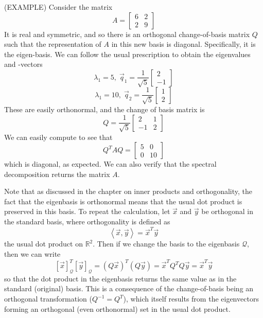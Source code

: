 (EXAMPLE) Consider the matrix \[ A= \left[ \begin{array}{cc} 6 & 2 \\ 2 & 9 \end{array} \right] \] It is real and symmetric, and so there is an orthogonal change-of-basis matrix $Q$ such that the representation of $A$ in this new basis is diagonal. Specifically, it is the eigen-basis. We can follow the usual prescription to obtain the eigenvalues and -vectors \[ \lambda_1 = 5, \; \vec{q}_1 =\frac{1}{\sqrt{5}} \left[ \begin{array}{c} 2 \\ -1 \end{array}\right] \] \[ \lambda_1 = 10, \; \vec{q}_2 =\frac{1}{\sqrt{5}} \left[ \begin{array}{c} 1 \\ 2 \end{array}\right] \] These are easily orthonormal, and the change of basis matrix is \[ Q = \frac{1}{\sqrt{5}} \left[ \begin{array}{cc} 2 & 1 \\ -1 & 2 \end{array}\right] \] We can easily compute to see that \[  Q^T A Q = \left[ \begin{array}{cc} 5 & 0 \\ 0 & 10 \end{array}\right] \] which is diagonal, as expected. We can also verify that the spectral decomposition returns the matrix $A$.

Note that as discussed in the chapter on inner products and orthogonality, the fact that the eigenbasis is orthonormal means that the usual dot product is preserved in this basis. To repeat the calculation, let $\vec{x}$ and $\vec{y}$ be orthogonal in the standard basis, where orthogonality is defined as \[ \left\langle \vec{x}, \vec{y}\right\rangle = \vec{x}^T \vec{y} \] the usual dot product on $\mathbb{R}^2$. Then if we change the basis to the eigenbasis $\mathcal{Q}$, then we can write \[ \left[ \vec{x}\right]_{\mathcal{Q}}^T \left[ \vec{y}\right]_{\mathcal{Q}} = \left(Q\vec{x}\right)^T \left(Q\vec{y}\right) = \vec{x}^T Q^T Q \vec{y} = \vec{x}^T \vec{y} \] so that the dot product in the eigenbasis returns the same value as in the standard (original) basis. This is a consequence of the change-of-basis being an orthogonal transformation ($Q^{-1}=Q^T$), which itself results from the eigenvectors forming an orthogonal (even orthonormal) set in the usual dot product.




